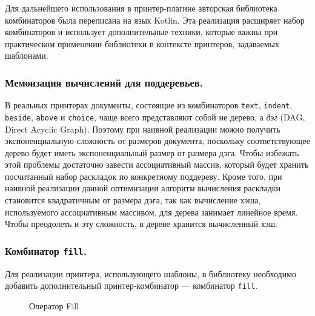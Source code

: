 Для дальнейшего использования в принтер-плагине авторская библиотека комбинаторов
была переписана на язык Kotlin.
Эта реализация расширяет набор комбинаторов и использует
дополнительные техники, которые важны при практическом применении библиотеки в
контексте принтеров, задаваемых шаблонами.

\subsubsection{Мемоизация вычислений для поддеревьев.}

В реальных принтерах документы, состоящие из комбинаторов
\lstinline[language=Haskell]{text},
\lstinline[language=Haskell]{indent},
\lstinline[language=Haskell]{beside},
\lstinline[language=Haskell]{above} и \lstinline[language=Haskell]{choice}, чаще всего
представляют собой не дерево, а \emph{дэг} (DAG, Direct Acyclic Graph). Поэтому при наивной
реализации можно получить экспоненциальную сложность от размеров документа,
поскольку соответствующее дерево будет иметь экспоненциальный размер от размера дэга.
Чтобы избежать этой проблемы достаточно завести ассоциативный массив,
который будет хранить посчитанный набор раскладок по конкретному поддереву.
Кроме того, при наивной реализации данной оптимизации
алгоритм вычисления раскладки становится квадратичным от размера дэга,
так как вычисление хэша, используемого ассоциативным массивом, для дерева занимает
линейное время. Чтобы преодолеть и эту сложность, в дереве хранится вычисленный хэш.

\subsubsection{Комбинатор \lstinline{fill}.}

Для реализации принтера, использующего шаблоны, в библиотеку необходимо добавить
дополнительный принтер-комбинатор --- комбинатор \lstinline{fill}.

\begin{figure}[h!]
  \centering
	\quad
	\caption{Оператор Fill}
\end{figure}

